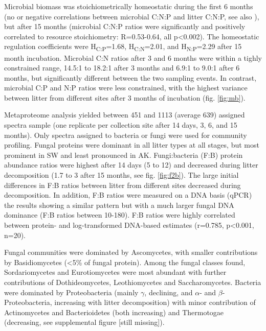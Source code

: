 Microbial biomass was stoichiometrically homeostatic during the first 6 months (no or negative correlations between microbial C:N:P and litter C:N:P, see also \cite{Mooshammer2011}), but after 15 months (microbial C:N:P ratios were significantly and positively correlated to resource stoichiometry: R=0.53-0.64, all p\textless 0.002). The homeostatic regulation coefficients \cite{Sterner2002} were H\textsubscript{C:P}=1.68, H\textsubscript{C:N}=2.01, and H\textsubscript{N:P}=2.29 after 15 month incubation. Microbial C:N ratios after 3 and 6 months were within a tighly constrained range, 14.5:1 to 18.2:1 after 3 months and 6.9:1 to 9.0:1 after 6 months, but significantly different between the two sampling events. In contrast, microbial C:P and N:P ratios were less constrained, with the highest variance between litter from different sites after 3 months of incubation (fig. \ref{fig:mb}).

Metaproteome analysis yielded between 451 and 1113 (average 639) assigned spectra sample (one replicate per collection site after 14 days, 3, 6, and 15 months). Only spectra assigned to bacteria or fungi were used for community profiling. Fungal proteins were dominant in all litter types at all stages, but most prominent in SW and least pronounced in  AK. Fungi:bacteria (F:B) protein abundance ratios were highest after 14 days (5 to 12) and decreased during litter decomposition (1.7 to 3 after 15 months, see fig. \ref{fig:f2b}). The large initial differences in F:B ratios between litter from different sites decreased during decomposition. In addition, F:B ratios were measured on a DNA basis (qPCR) the results showing a similar pattern but with a much larger fungal DNA dominance (F:B ratios between 10-180). F:B ratios were highly correlated between protein- and log-transformed DNA-based estimates (r=0.785, p\textless 0.001, n=20).

Fungal communities were dominated by Ascomycetes, with smaller contributions by Basidiomycetes (<5\% of fungal protein).  Among the fungal classes found, Sordariomycetes and Eurotiomycetes were most abundant with further contributions of Dothideomycetes, Leothiomycetes and Saccharomycetes. Bacteria were dominated by Proteobacteria (mainly $\gamma$, declining, and $\alpha$- and $\beta$-Proteobacteria, increasing with litter decomposition) with minor contribution of Actinomycetes and Bacterioidetes (both increasing) and Thermotogae (decreasing, see supplemental figure [still missing]).

